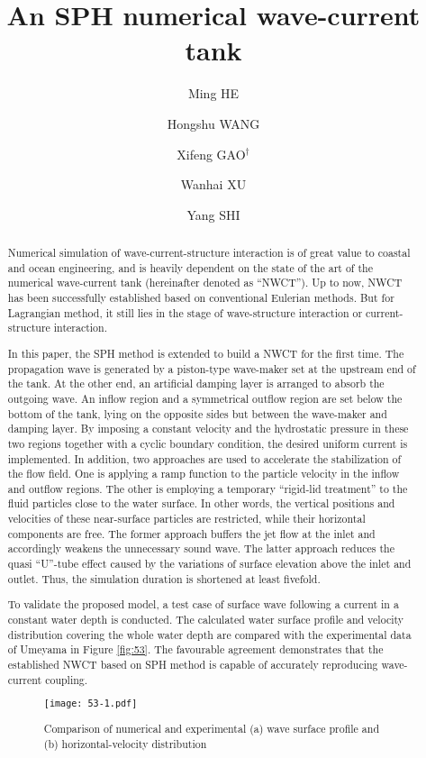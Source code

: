 \documentclass[10pt]{article}
\title{An SPH numerical wave-current tank}
\date{}
\author[$\relax$]{Ming HE}
\author[$\relax$]{Hongshu WANG}
\author[$\relax$]{Xifeng GAO$^\dagger$}
\author[$\relax$]{Wanhai XU}
\author[$\relax$]{Yang SHI}
\affil[$\relax$]{The State Key Laboratory of Hydraulic Engineering Simulation and Safety, Tianjin University, Tianjin, China}
\affil[$\relax$]{\email{\dagger}{gaoxifeng@tju.edu.cn}}
\begin{document}
\maketitle


\begin{abstract}
Numerical simulation of wave-current-structure interaction is of great value to coastal and ocean engineering, and is heavily dependent on the state of the art of the numerical wave-current tank (hereinafter denoted as ``NWCT''). Up to now, NWCT has been successfully established based on conventional Eulerian methods. But for Lagrangian method, it still lies in the stage of wave-structure interaction or current-structure interaction.

In this paper, the SPH method is extended to build a NWCT for the first time. The propagation wave is generated by a piston-type wave-maker set at the upstream end of the tank. At the other end, an artificial damping layer is arranged to absorb the outgoing wave. An inflow region and a symmetrical outflow region are set below the bottom of the tank, lying on the opposite sides but between the wave-maker and damping layer. By imposing a constant velocity and the hydrostatic pressure in these two regions together with a cyclic boundary condition, the desired uniform current is implemented. In addition, two approaches are used to accelerate the stabilization of the flow field. One is applying a ramp function to the particle velocity in the inflow and outflow regions. The other is employing a temporary ``rigid-lid treatment'' to the fluid particles close to the water surface. In other words, the vertical positions and velocities of these near-surface particles are restricted, while their horizontal components are free. The former approach buffers the jet flow at the inlet and accordingly weakens the unnecessary sound wave. The latter approach reduces the quasi ``U''-tube effect caused by the variations of surface elevation above the inlet and outlet. Thus, the simulation duration is shortened at least fivefold.

To validate the proposed model, a test case of surface wave following a current in a constant water depth is conducted. The calculated water surface profile and velocity distribution covering the whole water depth are compared with the experimental data of Umeyama \cite{umeyama2010coupled} in Figure \ref{fig:53}. The favourable agreement demonstrates that the established NWCT based on SPH method is capable of accurately reproducing wave-current coupling. 

\begin{figure}[!htb]
\centering
\texttt{[image: 53-1.pdf]}
\caption{Comparison of numerical and experimental (a) wave surface profile and (b) horizontal-velocity distribution}\label{fig:53}
\end{figure}

\end{abstract}



\addbib
\end{document}
